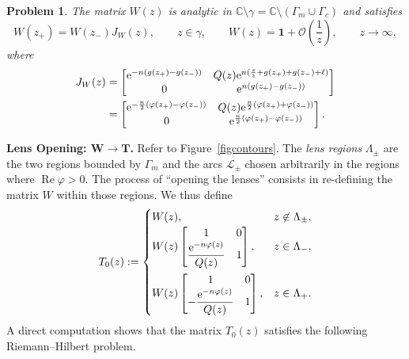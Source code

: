 \documentclass[10pt,a4paper]{amsart}
\numberwithin{equation}{section}
\newtheorem{problem}[Theorem]{Problem}
\theoremstyle{definition}
\def \scr{\mathscr}
\def \ds{\displaystyle}
\def\le{\left}
\def\ri{\right}
\def \1{\mathbf 1}
\def\C{{\mathbb C}}
\def \Re{\operatorname{Re} }
\begin{document}
\begin{problem}
\label{RHPW}The matrix $W(z)$ is analytic in $\C \setminus \gamma = \C\setminus (\Gamma_m\cup \Gamma_c)$ and satisfies
\[
W(z_+)= W(z_-) J_W(z), \qquad z\in \gamma,\qquad
W(z) = \1 + \mathcal O\le(\frac 1 z \ri), \qquad z\to \infty,
\]
where
\begin{align*}
J_W(z) &= \begin{bmatrix}
{\rm e}^{-n(g(z_+)-g(z_-))} & Q(z) {\rm e}^{ n(\frac s z + g(z_+)+ g(z_-) + \ell)}\\
0 & {\rm e}^{n(g(z_+)-g(z_-))}
\end{bmatrix}\\
&=\begin{bmatrix}
{\rm e}^{-\frac n2( \varphi(z_+)-\varphi(z_-)) } & Q(z) {\rm e}^{ \frac n2 (\varphi(z_+)+\varphi(z_-))}\\
0 & {\rm e}^{\frac n2 (\varphi(z_+)-\varphi(z_-) )}
\end{bmatrix}.
\end{align*}
\end{problem}
{\bf Lens Opening: $\boldsymbol{W\to T}$.}
Refer to Figure~\ref{figcontours}. The {\it lens regions} $\Lambda_\pm$ are the two regions bounded by $\Gamma_m$ and the arcs $\scr L_\pm$ chosen arbitrarily in the regions where $\Re \varphi>0$.
The process of ``opening the lenses'' consists in re-defining the matrix $W$ within those regions.
We thus define
\begin{gather}
\label{defT}
T_0(z):=
\begin{cases}
W(z), & z\not \in \Lambda_\pm,\\
\ds W(z)\begin{bmatrix}
1 & 0 \\
\displaystyle \frac{{\rm e}^{-n\varphi(z)}}{Q(z)} & 1
\end{bmatrix}, & z\in \Lambda_-,
\vspace{1mm}\\
W(z) \begin{bmatrix}
1 & 0 \\
\displaystyle-\frac{ {\rm e}^{-n\varphi(z)}}{Q(z)} & 1
\end{bmatrix}, & z\in \Lambda_+.
\end{cases}
\end{gather}
A direct computation shows that the matrix $T_0(z)$ satisfies the following Riemann--Hilbert problem.
\end{document}
